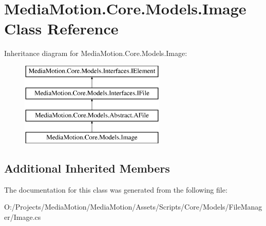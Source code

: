 \hypertarget{class_media_motion_1_1_core_1_1_models_1_1_image}{\section{Media\+Motion.\+Core.\+Models.\+Image Class Reference}
\label{class_media_motion_1_1_core_1_1_models_1_1_image}
}
Inheritance diagram for Media\+Motion.\+Core.\+Models.\+Image\+:\begin{figure}[H]
\begin{center}
\leavevmode
\includegraphics[height=4.000000cm]{class_media_motion_1_1_core_1_1_models_1_1_image}
\end{center}
\end{figure}
\subsection*{Additional Inherited Members}


The documentation for this class was generated from the following file\+:\begin{DoxyCompactItemize}
\item 
O\+:/\+Projects/\+Media\+Motion/\+Media\+Motion/\+Assets/\+Scripts/\+Core/\+Models/\+File\+Manager/Image.\+cs\end{DoxyCompactItemize}

